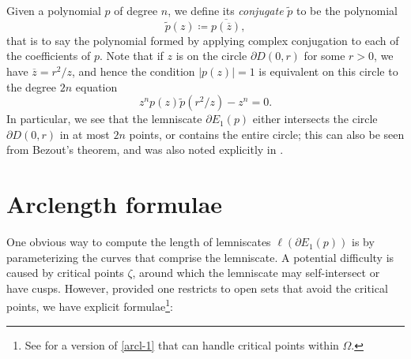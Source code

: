 \documentclass[12pt]{amsart}
\begin{document}
Given a polynomial $p$ of degree $n$, we define its \emph{conjugate} $\tilde p$ to be the polynomial
\begin{equation}\label{tildep-def}
    \tilde p(z) \coloneqq \overline{p(\overline{z})},
\end{equation}
that is to say the polynomial formed by applying complex conjugation to each of the coefficients of $p$.  Note that if $z$ is on the circle $\partial D(0,r)$ for some $r>0$, we have $\overline{z} = r^2/z$, and hence the condition $|p(z)|=1$ is equivalent on this circle to the degree $2n$ equation
\begin{equation}\label{tilde-r}
z^n p(z) \tilde p(r^2/z) - z^n = 0.
\end{equation}
In particular, we see that the lemniscate $\partial E_1(p)$ either intersects the circle $\partial D(0,r)$ in at most $2n$ points, or contains the entire circle; this can also be seen from Bezout's theorem, and was also noted explicitly in \cite[Lemma 1]{eremenko}.


\section{Arclength formulae}\label{arclength-sec}

One obvious way to compute the length of lemniscates $\ell(\partial E_1(p))$ is by parameterizing the curves that comprise the lemniscate.  A potential difficulty is caused by critical points $\zeta$, around which the lemniscate may self-intersect or have cusps.  However, provided one restricts to open sets that avoid the critical points, we have explicit formulae\footnote{See \cite[Theorem 1]{kosukhin} for a version of \eqref{arcl-1} that can handle critical points within $\Omega$.}:
\end{document}

